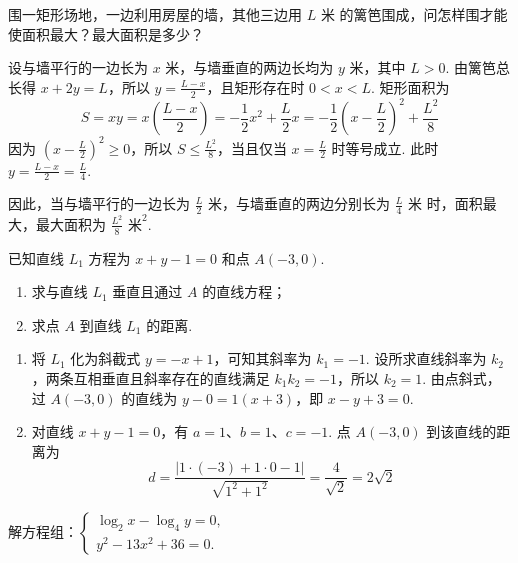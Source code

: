 \begin{problem}
围一矩形场地，一边利用房屋的墙，其他三边用 \(L\text{ 米}\) 的篱笆围成，问怎样围才能使面积最大？最大面积是多少？

\end{problem}

\begin{solution}
设与墙平行的一边长为 \(x\text{ 米}\)，与墙垂直的两边长均为 \(y\text{ 米}\)，其中 \(L>0\). 由篱笆总长得 \(x+2y=L\)，所以 \(y=\frac{L-x}{2}\)，且矩形存在时 \(0<x<L\). 矩形面积为
\[
S=xy=x\left(\frac{L-x}{2}\right)=-\frac{1}{2}x^2+\frac{L}{2}x=-\frac{1}{2}\left(x-\frac{L}{2}\right)^2+\frac{L^2}{8}
\]
因为 \(\left(x-\frac{L}{2}\right)^2\geq 0\)，所以 \(S\leq\frac{L^2}{8}\)，当且仅当 \(x=\frac{L}{2}\) 时等号成立. 此时 \(y=\frac{L-x}{2}=\frac{L}{4}\).

因此，当与墙平行的一边长为 \(\frac{L}{2}\text{ 米}\)，与墙垂直的两边分别长为 \(\frac{L}{4}\text{ 米}\) 时，面积最大，最大面积为 \(\frac{L^2}{8}\text{ 米}^2\).
\end{solution}

\begin{problem}
已知直线 \(L_1\) 方程为 \(x+y-1=0\) 和点 \(A\left(-3,0\right)\).

\begin{enumerate}
\item 求与直线 \(L_1\) 垂直且通过 \(A\) 的直线方程；

\item 求点 \(A\) 到直线 \(L_1\) 的距离.
\end{enumerate}
\end{problem}

\begin{solution}
\begin{enumerate}
\item 将 \(L_1\) 化为斜截式 \(y=-x+1\)，可知其斜率为 \(k_1=-1\). 设所求直线斜率为 \(k_2\)，两条互相垂直且斜率存在的直线满足 \(k_1k_2=-1\)，所以 \(k_2=1\). 由点斜式，过 \(A\left(-3,0\right)\) 的直线为 \(y-0=1\left(x+3\right)\)，即 \(x-y+3=0\).

\item 对直线 \(x+y-1=0\)，有 \(a=1\)、\(b=1\)、\(c=-1\). 点 \(A\left(-3,0\right)\) 到该直线的距离为
\[
d=\frac{\left|1\cdot(-3)+1\cdot0-1\right|}{\sqrt{1^2+1^2}}=\frac{4}{\sqrt{2}}=2\sqrt{2}
\]
\end{enumerate}
\end{solution}

\begin{problem}
解方程组：\(\begin{cases}
\log_2 x-\log_4 y=0,\\
y^2-13x^2+36=0.
\end{cases}\)
\end{problem}

